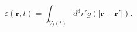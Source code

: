 \begin{equation}
\varepsilon(\mathbf{r},t) = \int_{V_f(t)}{d^3 r' g(|\mathbf{r} - \mathbf{r'}|)}.
 \label{eq:voidfraction}
\end{equation}
